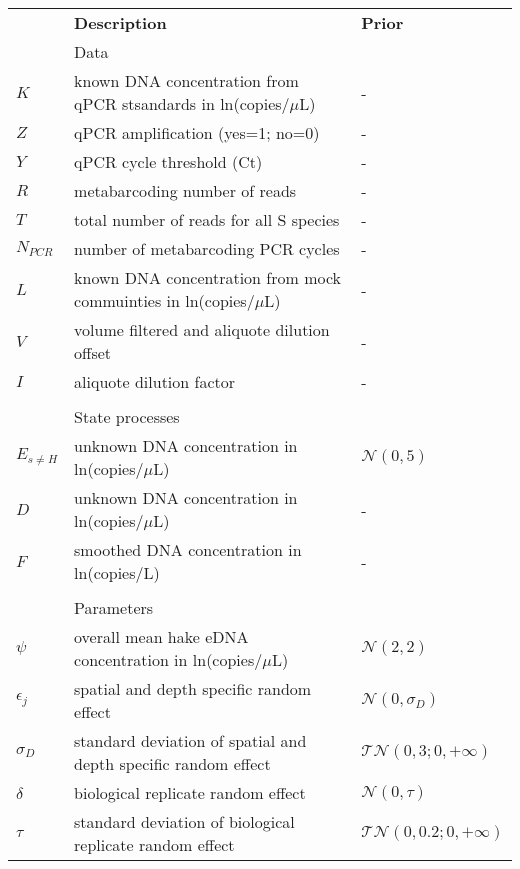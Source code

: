 \documentclass{article}
\begin{document}
\begin{table}[h]
    \centering
    \begin{tabular}{lll}
         & \textbf{Description} & \textbf{Prior} \\
&Data & \\
\hline
$K$ & known DNA concentration from qPCR stsandards in ln(copies/$\mu$L) & - \\
$Z$ & qPCR amplification (yes=1; no=0) & - \\
$Y$ & qPCR cycle threshold (Ct) & - \\
$R$ & metabarcoding number of reads & - \\
$T$ & total number of reads for all S species & - \\
$N_{PCR}$ & number of metabarcoding PCR cycles & - \\
$L$ & known DNA concentration from mock commuinties in ln(copies/$\mu$L) & - \\
$V$ & volume filtered and aliquote dilution offset & -\\
$I$ & aliquote dilution factor & -\\

&&\\
&State processes&\\
\hline
$E_{s\neq H}$ & unknown DNA concentration in ln(copies/$\mu$L) & $\mathcal{N}(0,5)$\\
$D$ & unknown DNA concentration in ln(copies/$\mu$L)& - \\
$F$ & smoothed DNA concentration in ln(copies/L) & - \\
&&\\

&Parameters&\\
\hline
$\psi$& overall mean hake eDNA concentration in ln(copies/$\mu$L) & $\mathcal{N}(2,2)$\\
$\epsilon_{j}$& spatial and depth specific random effect & $\mathcal{N}(0,\sigma_D)$\\
$\sigma_D $& standard deviation of spatial and depth specific random effect & $\mathcal{TN}(0,3;0, +\infty)$\\

$\delta$& biological replicate random effect & $\mathcal{N}(0,\tau)$\\
$\tau$& standard deviation of biological replicate random effect & $\mathcal{TN}(0,0.2;0, +\infty)$\\


\end{tabular}
\end{table}
\end{document}
